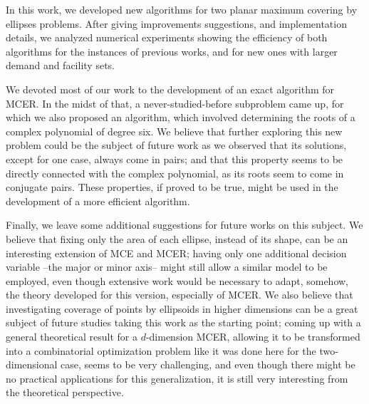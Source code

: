 In this work, we developed new algorithms for two planar maximum covering by ellipses problems.
After giving improvements suggestions, and implementation details, we analyzed numerical experiments showing the efficiency of both algorithms for the instances of previous works, and for new ones with larger demand and facility sets.

We devoted most of our work to the development of an exact algorithm for MCER.
In the midst of that, a never-studied-before subproblem came up, for which we also proposed an algorithm, which involved determining the roots of a complex polynomial of degree six.
We believe that further exploring this new problem could be the subject of future work as we observed that its solutions, except for one case, always come in pairs; and that this property seems to be directly connected with the complex polynomial, as its roots seem to come in conjugate pairs. These properties, if proved to be true, might be used in the development of a more efficient algorithm.

{\color{Green}
	Finally, we leave some additional suggestions for future works on this subject. We believe that fixing only the area of each ellipse, instead of its shape, can be an interesting extension of MCE and MCER; having only one additional decision variable --the major or minor axis-- might still allow a similar model to be employed, even though extensive work would be necessary to adapt, somehow, the theory developed for this version, especially of MCER.
We also believe that investigating coverage of points by ellipsoids in higher dimensions can be a great subject of future studies taking this work as the starting point; 
coming up with a general theoretical result for a $d$-dimension MCER, allowing it to be transformed into a combinatorial optimization problem like it was done here for the two-dimensional case, seems to be very challenging, and even though there might be no practical applications for this generalization, it is still very interesting from the theoretical perspective. }

